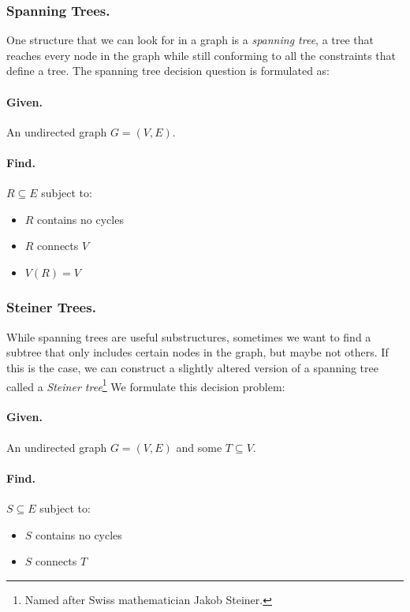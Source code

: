 \documentclass[12pt,twoside]{reedthesis}
\theoremstyle{definition}
\begin{document}
   \subsubsection{Spanning Trees.}
   One structure that we can look for in a graph is a \textit{spanning tree}, a tree that reaches every node in the graph while still conforming to all the constraints that define a tree. The spanning tree decision question is formulated as:

   \bigbreak

   \hfill\begin{minipage}{\dimexpr\textwidth-2cm}
   \paragraph{Given.}An undirected graph $G=(V,E)$.
   \paragraph{Find.}$R \subseteq E$ subject to:
   \begin{itemize}
     \item{$R$ contains no cycles}
     \item{$R$ connects $V$}
     \item{$V(R) = V$}
   \end{itemize}
\xdef\tpd{\the\prevdepth}
\end{minipage}



   \subsubsection{Steiner Trees.}
   While spanning trees are useful substructures, sometimes we want to find a subtree that only includes certain nodes in the graph, but maybe not others. If this is the case, we can construct a slightly altered version of a spanning tree called a \textit{Steiner tree}\footnote{Named after Swiss mathematician Jakob Steiner.} We formulate this decision problem:

   \bigbreak

   \hfill\begin{minipage}{\dimexpr\textwidth-2cm}
   \paragraph{Given.}An undirected graph $G=(V,E)$ and some $T \subseteq V$.
   \paragraph{Find.}$S \subseteq E$ subject to:
   \begin{itemize}
     \item{$S$ contains no cycles}
     \item{$S$ connects $T$}
   \end{itemize}
\xdef\tpd{\the\prevdepth}
\end{minipage}
\end{document}
